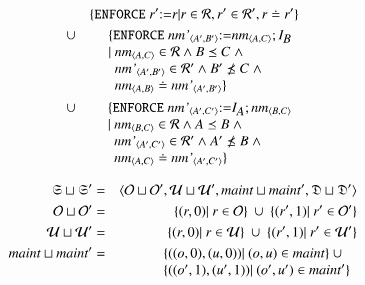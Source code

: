 \documentclass{elsarticle}
\begin{document}
\begin{definition}
	\begin{eqnarray}
		&&\{ {\tt ENFORCE\ }r'{\tt := }r| r\in\rels, r'\in\rels', r\doteq r'\}\\
		&\cup&\begin{array}[t]{@{}l}
				\{ {\tt ENFORCE\ }\declare{nm'}{A'}{B'}{\tt := }\declare{nm}{A}{C};\ident{B}\\
				|\ \begin{array}[t]{@{}l}
					\declare{nm}{A}{C}\in\rels\wedge B\isa C\ \wedge\\
					\declare{nm'}{A'}{B'}\in\rels'\wedge B'\not\isa C\ \wedge\\
					\declare{nm}{A}{B}\doteq\declare{nm'}{A'}{B'}\}
				   \end{array}
			  \end{array}\\
		&\cup&\begin{array}[t]{@{}l}
				\{ {\tt ENFORCE\ }\declare{nm'}{A'}{C'}{\tt := }\ident{A};\declare{nm}{B}{C}\\
				|\ \begin{array}[t]{@{}l}
					\declare{nm}{B}{C}\in\rels\wedge A\isa B\ \wedge\\
					\declare{nm'}{A'}{C'}\in\rels'\wedge A'\not\isa B\ \wedge\\
					\declare{nm}{A}{C}\doteq\declare{nm'}{A'}{C'}\}
				   \end{array}
			  \end{array}
	\end{eqnarray}
\end{definition}
\begin{definition}
	\begin{eqnarray}
		\infsys\sqcup\infsys'&=&\la\roles\sqcup\roles',\rules\sqcup\rules',\maintain\sqcup\maintain',\dataset\sqcup\dataset'\ra\\
		\roles\sqcup\roles'&=&\{(r,0)|\ r\in\roles\}\ \cup\ \{(r',1)|\ r'\in\roles'\}\\
		\rules\sqcup\rules'&=&\{(r,0)|\ r\in\rules\}\ \cup\ \{(r',1)|\ r'\in\rules'\}\\
		\maintain\sqcup\maintain'&=&\begin{array}[t]{@{}l}
							  \{((o,0),(u,0))|\ (o,u)\in\maintain\}\ \cup\\
			                  \{((o',1),(u',1))|\ (o',u')\in\maintain'\}
							\end{array}
	\end{eqnarray}
\end{definition}
\end{document}
